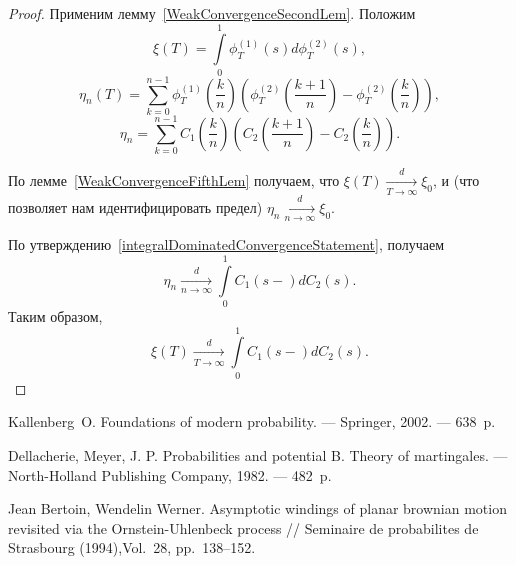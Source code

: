 \documentclass[12pt, a4paper, titlepage]{article}
\begin{document}
\begin{proof}
 Применим лемму~\ref{WeakConvergenceSecondLem}. Положим
$$\xi(T)=\int\limits_0^1 \phi^{(1)}_T(s)d\phi^{(2)}_T(s),$$
$$\eta_n(T)=
\sum\limits_{k=0}^{n-1}\phi^{(1)}_T\left(\frac{k}{n}\right)\left(\phi^{(2)}_T\left(\frac{k+1}{n}\right)-
\phi^{(2)}_T\left(\frac{k}{n}\right)\right),$$
$$\eta_n=\sum\limits_{k=0}^{n-1}C_1\left(\frac{k}{n}\right)\left(C_2\left(\frac{k+1}{n}\right)-
C_2\left(\frac{k}{n}\right)\right).$$

По лемме~\ref{WeakConvergenceFifthLem} получаем, что 
$\xi(T)\xrightarrow[T\to\infty]{d}\xi_0$, и (что позволяет нам идентифицировать предел)
$\eta_n\xrightarrow[n\to\infty]{d}\xi_0.$

По утверждению~\ref{integralDominatedConvergenceStatement}, получаем
$$\eta_n\xrightarrow[n\to\infty]{d}\int\limits_0^1 C_1(s-)dC_2(s).$$
Таким образом,
$$\xi(T)\xrightarrow[T\to\infty]{d} \int\limits_0^1 C_1(s-)dC_2(s).$$
\end{proof}

\begin{thebibliography}{99}
Kallenberg~O.
Foundations of modern probability. --- Springer, 2002. --- 638~p.

Dellacherie, Meyer, J. P.
Probabilities and potential B. Theory of martingales. --- 
North-Holland Publishing Company, 1982. --- 482~p. 

Jean Bertoin, Wendelin Werner.
Asymptotic windings of planar brownian motion revisited via the Ornstein-Uhlenbeck process //
Seminaire de probabilites de Strasbourg (1994),Vol.~28, pp.~138--152. 

\end{thebibliography}
\end{document}
